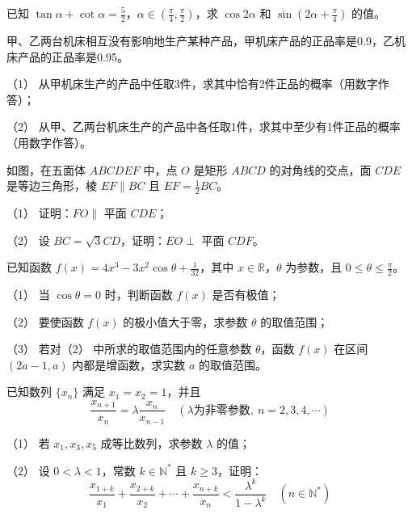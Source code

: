 \begin{question}
已知 $\tan\alpha+\cot\alpha=\frac52$，$\alpha\in(\frac\pi4,\frac\pi2)$，求 $\cos2\alpha$ 和 $\sin(2\alpha+\frac\pi4)$ 的值。

\end{question}
\begin{question}
甲、乙两台机床相互没有影响地生产某种产品，甲机床产品的正品率是0.9，乙机床产品的正品率是0.95。

（1） 从甲机床生产的产品中任取3件，求其中恰有2件正品的概率（用数字作答）；

（2） 从甲、乙两台机床生产的产品中各任取1件，求其中至少有1件正品的概率（用数字作答）。

\Needspace{0.4\textheight}
\end{question}
\begin{question}
如图，在五面体 $ABCDEF$ 中，点 $O$ 是矩形 $ABCD$ 的对角线的交点，面 $CDE$ 是等边三角形，棱 $EF\parallel BC$ 且 $EF=\frac12BC$。

（1） 证明：$FO\parallel$ 平面 $CDE$；

（2） 设 $BC=\sqrt3CD$，证明：$EO\perp$ 平面 $CDF$。
\nopagebreak[4]
\begin{center}\end{center}
\nopagebreak[4]
\end{question}
\begin{question}
已知函数 $f(x)=4x^3-3x^2\cos\theta+\frac1{32}$，其中 $x\in\mathbb R$，$\theta$ 为参数，且 $0\le\theta\le\frac\pi2$。

（1） 当 $\cos\theta=0$ 时，判断函数 $f(x)$ 是否有极值；

（2） 要使函数 $f(x)$ 的极小值大于零，求参数 $\theta$ 的取值范围；

（3） 若对（2） 中所求的取值范围内的任意参数 $\theta$，函数 $f(x)$ 在区间 $(2a-1,a)$ 内都是增函数，求实数 $a$ 的取值范围。

\end{question}
\begin{question}
已知数列 $\{x_n\}$ 满足 $x_1=x_2=1$，并且
\nopagebreak[4]
\[
\frac{x_{n+1}}{x_n}=\lambda\frac{x_n}{x_{n-1}}\quad(\lambda\text{为非零参数},\ n=2,3,4,\cdots)
\]

（1） 若 $x_1,x_3,x_5$ 成等比数列，求参数 $\lambda$ 的值；

（2） 设 $0<\lambda<1$，常数 $k\in\mathbb N^*$ 且 $k\ge3$，证明：
\nopagebreak[4]
\[
\frac{x_{1+k}}{x_1}+\frac{x_{2+k}}{x_2}+\cdots+\frac{x_{n+k}}{x_n}<\frac{\lambda^k}{1-\lambda^k}\quad(n\in\mathbb N^*)
\]

\Needspace{0.4\textheight}
\end{question}
